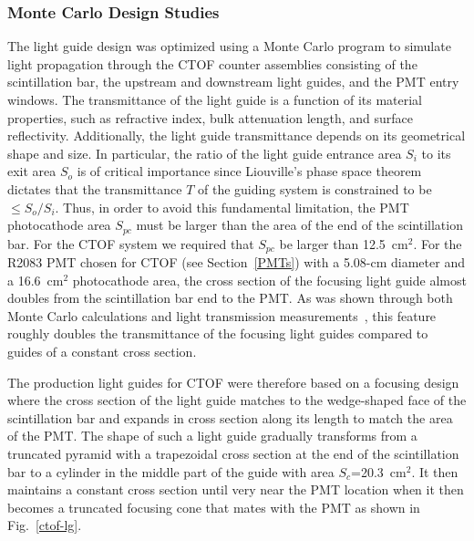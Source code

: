 \documentclass{elsart}
\begin{document}
\subsubsection{Monte Carlo Design Studies}
\label{lg-mc}

The light guide design was optimized using a Monte Carlo program to simulate light propagation
through the CTOF counter assemblies consisting of the scintillation bar, the upstream and
downstream light guides, and the PMT entry windows. The transmittance of the light guide is a
function of its material properties, such as refractive index, bulk attenuation length, and
surface reflectivity. Additionally, the light guide transmittance depends on its geometrical
shape and size. In particular, the ratio of the light guide entrance area $S_i$ to its exit
area $S_o$ is of critical importance since Liouville's phase space theorem dictates that the 
transmittance $T$ of the guiding system is constrained to be $\le S_o/S_i$. Thus, in
order to avoid this fundamental limitation, the PMT photocathode area $S_{pc}$ must be larger
than the area of the end of the scintillation bar. For the CTOF system we required that $S_{pc}$
be larger than 12.5~cm$^2$. For the R2083 PMT chosen for CTOF (see Section~\ref{PMTs})
with a 5.08-cm diameter and a 16.6~cm$^2$ photocathode area, the cross section of the focusing
light guide almost doubles from the scintillation bar end to the PMT. As was shown through both
Monte Carlo calculations and light transmission measurements~\cite{barbosa06}, this feature
roughly doubles the transmittance of the focusing light guides compared to guides of a constant
cross section.

The production light guides for CTOF were therefore based on a focusing design where 
the cross section of the light guide matches to the wedge-shaped face of the scintillation bar 
and expands in cross section along its length to match the area of the PMT. The shape of such a 
light guide gradually transforms from a truncated pyramid with a trapezoidal cross section at 
the end of the scintillation bar to a cylinder in the middle part of the guide with area 
$S_c$=20.3~cm$^2$. It then maintains a constant cross section until very near the PMT location 
when it then becomes a truncated focusing cone that mates with the PMT as shown in
Fig.~\ref{ctof-lg}.
\end{document}
